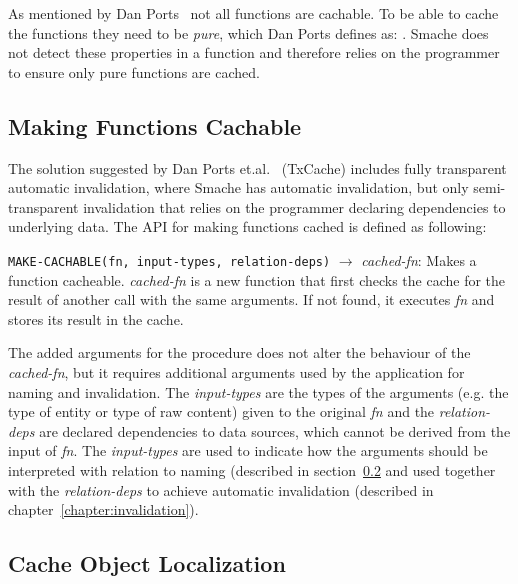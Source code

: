 As mentioned by Dan Ports~\cite{paper:liskov} not all functions are cachable. To be able to cache the functions they need to be \emph{pure}, which Dan Ports defines as: . Smache does not detect these properties in a function and therefore relies on the programmer to ensure only pure functions are cached.


\subsection{Making Functions Cachable}
\label{subsec:making-functions-cachable}

The solution suggested by Dan Ports et.al.~\cite{paper:liskov} (TxCache) includes fully transparent automatic invalidation, where Smache has automatic invalidation, but only semi-transparent invalidation that relies on the programmer declaring dependencies to underlying data. The API for making functions cached is defined as following:

\verb$MAKE-CACHABLE(fn, input-types, relation-deps)$ $\rightarrow$ \emph{cached-fn}: Makes a function cacheable. \emph{cached-fn} is a new function that first checks the cache for the result of another call with the same arguments. If not found, it executes \emph{fn} and stores its result in the cache.

The added arguments for the procedure does not alter the behaviour of the \emph{cached-fn}, but it requires additional arguments used by the application for naming and invalidation. The \emph{input-types} are the types of the arguments (e.g. the type of entity or type of raw content) given to the original \emph{fn} and the \emph{relation-deps} are declared dependencies to data sources, which cannot be derived from the input of \emph{fn}. The \emph{input-types} are used to indicate how the arguments should be interpreted with relation to naming (described in section~\ref{subsec:cache-object-localization} and used together with the \emph{relation-deps} to achieve automatic invalidation (described in chapter~\ref{chapter:invalidation}).


\subsection{Cache Object Localization}
\label{subsec:cache-object-localization}

